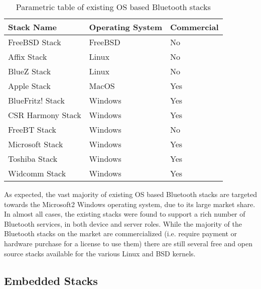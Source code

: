 \begin{table}[H]
	\begin{center}
		\begin{tabular}{ | l | l | l |}
			\hline
			\textbf{Stack Name}	& \textbf{Operating System}	& \textbf{Commercial} \\ \hline

			FreeBSD Stack		& FreeBSD	& No	\\ \hline
			Affix Stack			& Linux		& No	\\ \hline
			BlueZ Stack			& Linux		& No	\\ \hline
			Apple Stack			& MacOS		& Yes	\\ \hline
			BlueFritz! Stack	& Windows	& Yes	\\ \hline
			CSR Harmony Stack	& Windows	& Yes	\\ \hline
			FreeBT Stack 		& Windows	& No	\\ \hline
			Microsoft Stack		& Windows	& Yes	\\ \hline
			Toshiba Stack		& Windows	& Yes	\\ \hline
			Widcomm Stack		& Windows	& Yes	\\ \hline
		\end{tabular}
		\caption[Existing Operating System Bluetooth Stacks]{Parametric table of existing OS based Bluetooth stacks}
		\label{tab:osbtstacks}
	\end{center}
\end{table}

As expected, the vast majority of existing OS based Bluetooth stacks are targeted towards the Microsoft2 Windows operating system, due to its large market share. In almost all cases, the existing stacks were found to support a rich number of Bluetooth services, in both device and server roles. While the majority of the Bluetooth stacks on the market are commercialized (i.e. require payment or hardware purchase for a license to use them) there are still several free and open source stacks available for the various Linux and BSD kernels.


\subsection{Embedded Stacks}

